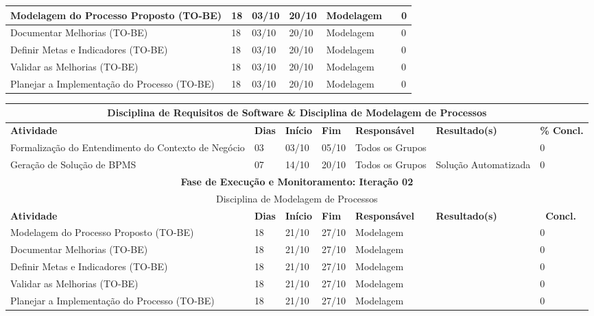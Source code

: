 \begin{landscape}
\begin{center}
\begin{tabular}{|m{6cm}|m{1cm}|m{1cm}|m{1cm}|m{4cm}|m{6cm}|m{2cm}|}
			Modelagem do Processo Proposto (TO-BE) & 18 & 03/10 & 20/10 & Modelagem & & 0 \\ \hline
			Documentar Melhorias (TO-BE) & 18 & 03/10 & 20/10 & Modelagem & & 0 \\ \hline
			Definir Metas e Indicadores (TO-BE) & 18 & 03/10 & 20/10 & Modelagem & & 0 \\ \hline
			Validar as Melhorias (TO-BE) & 18 & 03/10 & 20/10 & Modelagem & & 0 \\ \hline
			Planejar a Implementação do Processo (TO-BE) & 18 & 03/10 & 20/10 & Modelagem & & 0 \\ \hline
			\end{tabular}
		\end{center}
		\begin{center}
			\begin{tabular}{|m{6cm}|m{1cm}|m{1cm}|m{1cm}|m{4cm}|m{6cm}|m{2cm}|}
			\hline
			\multicolumn{7}{|c|}{Disciplina de Requisitos de Software \& Disciplina de Modelagem de Processos} \\ \hline
			\textbf{Atividade} & \textbf{Dias} & \textbf{Início} & \textbf{Fim} & \textbf{Responsável} & \textbf{Resultado(s)} & \textbf{\% Concl.} \\ \hline
			Formalização do Entendimento do Contexto de Negócio & 03 & 03/10 & 05/10 & Todos os Grupos & & 0 \\ \hline
			Geração de Solução de BPMS & 07 & 14/10 & 20/10 & Todos os Grupos & Solução Automatizada & 0 \\ \hline
			\multicolumn{7}{|c|}{\textbf{Fase de Execução e Monitoramento: Iteração 02}} \\
			\hline
			\multicolumn{7}{|c|}{Disciplina de Modelagem de Processos} \\
			\hline
			\textbf{Atividade} & \textbf{Dias} & \textbf{Início} & \textbf{Fim} & \textbf{Responsável} & \textbf{Resultado(s)} & \textbf{\ Concl.} \\ \hline
			Modelagem do Processo Proposto (TO-BE) & 18 & 21/10 & 27/10 & Modelagem & & 0 \\ \hline
			Documentar Melhorias (TO-BE) & 18 & 21/10 & 27/10 & Modelagem & & 0 \\ \hline
			Definir Metas e Indicadores (TO-BE) & 18 & 21/10 & 27/10 & Modelagem & & 0 \\ \hline
			Validar as Melhorias (TO-BE) & 18 & 21/10 & 27/10 & Modelagem & & 0 \\ \hline
			Planejar a Implementação do Processo (TO-BE) & 18 & 21/10 & 27/10 & Modelagem & & 0 \\ \hline

\end{tabular}
\end{center}
\end{landscape}
